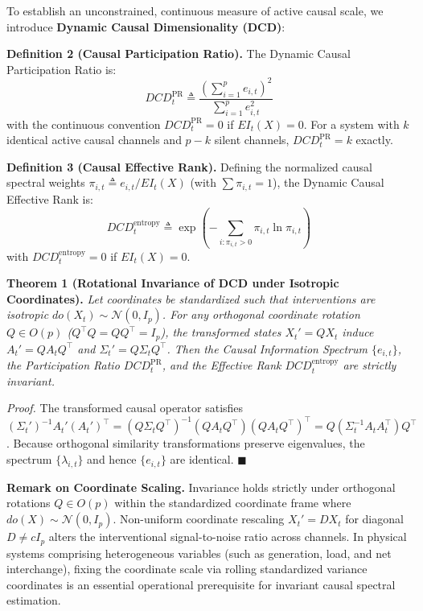 \documentclass[10pt,twocolumn,journal]{article}
\begin{document}
To establish an unconstrained, continuous measure of active causal scale, we introduce \textbf{Dynamic Causal Dimensionality (DCD)}:

\noindent \textbf{Definition 2 (Causal Participation Ratio).} The Dynamic Causal Participation Ratio is:
\begin{equation}
DCD_t^{\text{PR}} \triangleq \frac{\left( \sum_{i=1}^p e_{i,t} \right)^2}{\sum_{i=1}^p e_{i,t}^2}
\label{eq:dcd_pr}
\end{equation}
with the continuous convention $DCD_t^{\text{PR}} = 0$ if $EI_t(X) = 0$. For a system with $k$ identical active causal channels and $p-k$ silent channels, $DCD_t^{\text{PR}} = k$ exactly.

\noindent \textbf{Definition 3 (Causal Effective Rank).} Defining the normalized causal spectral weights $\pi_{i,t} \triangleq e_{i,t} / EI_t(X)$ (with $\sum \pi_{i,t} = 1$), the Dynamic Causal Effective Rank is:
\begin{equation}
DCD_t^{\text{entropy}} \triangleq \exp \left( - \sum_{i: \pi_{i,t} > 0} \pi_{i,t} \ln \pi_{i,t} \right)
\label{eq:dcd_entropy}
\end{equation}
with $DCD_t^{\text{entropy}} = 0$ if $EI_t(X) = 0$.

\noindent \textbf{Theorem 1 (Rotational Invariance of DCD under Isotropic Coordinates).} \textit{Let coordinates be standardized such that interventions are isotropic $do(X_t) \sim \mathcal{N}(0, I_p)$. For any orthogonal coordinate rotation $Q \in O(p)$ ($Q^\top Q = Q Q^\top = I_p$), the transformed states $X_t' = Q X_t$ induce $A_t' = Q A_t Q^\top$ and $\Sigma_t' = Q \Sigma_t Q^\top$. Then the Causal Information Spectrum $\{e_{i,t}\}$, the Participation Ratio $DCD_t^{\text{PR}}$, and the Effective Rank $DCD_t^{\text{entropy}}$ are strictly invariant.}

\textit{Proof.} The transformed causal operator satisfies $(\Sigma_t')^{-1} A_t' (A_t')^\top = (Q \Sigma_t Q^\top)^{-1} (Q A_t Q^\top)(Q A_t Q^\top)^\top = Q (\Sigma_t^{-1} A_t A_t^\top) Q^\top$. Because orthogonal similarity transformations preserve eigenvalues, the spectrum $\{\lambda_{i,t}\}$ and hence $\{e_{i,t}\}$ are identical. $\blacksquare$

\noindent \textbf{Remark on Coordinate Scaling.} Invariance holds strictly under orthogonal rotations $Q \in O(p)$ within the standardized coordinate frame where $do(X) \sim \mathcal{N}(0, I_p)$. Non-uniform coordinate rescaling $X_t' = D X_t$ for diagonal $D \neq c I_p$ alters the interventional signal-to-noise ratio across channels. In physical systems comprising heterogeneous variables (such as generation, load, and net interchange), fixing the coordinate scale via rolling standardized variance coordinates is an essential operational prerequisite for invariant causal spectral estimation.
\end{document}

